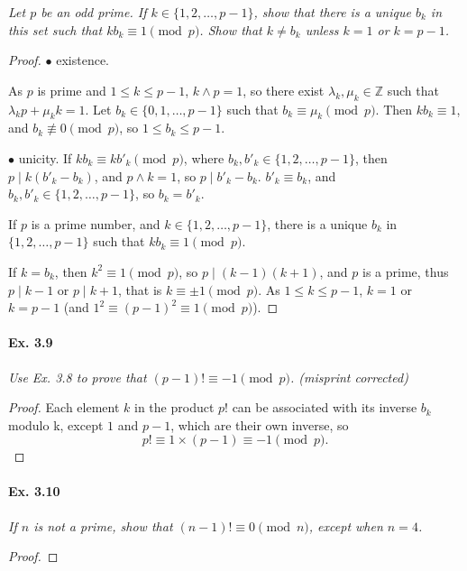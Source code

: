 \documentclass[11pt,a4paper]{article}
\newcommand{\Z}{\mathbb{Z}}
\begin{document}
{{\it Let $p$ be an odd prime. If $k \in \{1, 2, \ldots, p - 1\}$, show that there is a unique $b_k$ in this set such that $kb_k \equiv 1 \pmod p$. Show that $k \ne b_k$ unless $k = 1$ or $k = p - 1$.
}

\begin{proof}
$\bullet$ existence. 

As $p$ is prime and $1\leq k \leq p-1$, $k \wedge p= 1$, so there exist $\lambda_k,\mu_k\in \Z $ such that $\lambda_k p + \mu_k k = 1$.
Let $b_k \in \{0,1,\ldots,p-1\}$ such that $b_k \equiv \mu_k \pmod p$. Then  $k b_k \equiv 1$, and $b_k \not \equiv 0 \pmod p$, so $1\leq b_k \leq p-1$.

$\bullet$ unicity. If $kb_k \equiv kb'_k \pmod p$, where $b_k,b'_k \in \{1,2,\ldots,p-1\}$, then $p \mid k(b'_k-b_k)$, and $p \wedge k = 1$, so $p \mid b'_k-b_k$. $b'_k \equiv b_k$, and $b_k,b'_k \in \{1,2,\ldots,p-1\}$, so $b_k = b'_k$.

If $p$ is a prime number, and $k \in \{1, 2, \ldots, p - 1\}$, there is a unique $b_k$ in $\{1,2,\ldots,p-1\}$ such that $kb_k \equiv 1 \pmod p$.

\medskip

If $k = b_k$, then $k^2 \equiv 1 \pmod p$, so $p \mid (k-1)(k+1)$, and $p$ is a prime, thus $p \mid k-1$ or $p \mid k+1$, that is $k \equiv \pm 1 \pmod p$. 
As $1 \leq k \leq p-1$, $k = 1$ or $k = p-1$ (and $1^2 \equiv (p-1)^2 \equiv 1 \pmod p$).
\end{proof}

\paragraph{Ex. 3.9}

{\it Use Ex. 3.8 to prove that $(p - 1)! \equiv -1 \pmod p$. (misprint corrected)
}

\begin{proof}
Each element $k$ in the product $p!$ can be associated with its inverse $b_k$ modulo k, except $1$ and $p-1$, which are their own inverse, so
$$p! \equiv 1\times (p-1) \equiv -1 \pmod p.$$
\end{proof}

\paragraph{Ex. 3.10}

{\it If $n$ is not a prime, show that $(n - 1)! \equiv 0 \pmod n$, except when $n = 4$.
}

\begin{proof}


\end{proof}}
\end{document}

